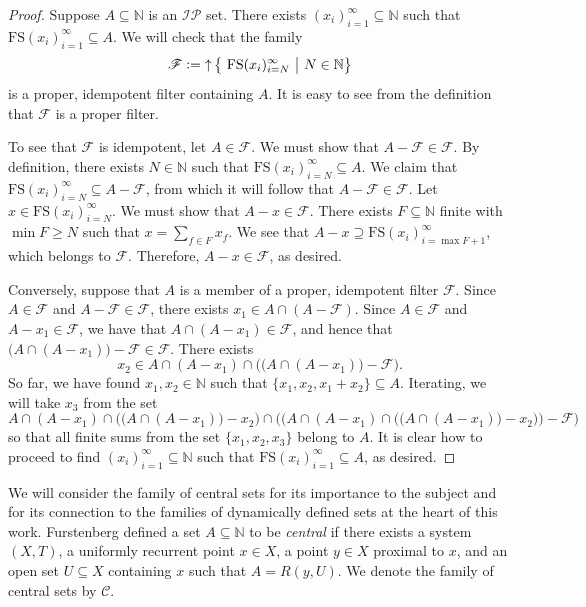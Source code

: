 \documentclass[letter,11pt]{article}
\theoremstyle{plain}
\theoremstyle{definition}
\theoremstyle{plain}
\theoremstyle{plain}
\numberwithin{equation}{section}
\newcommand{\N}{\mathbb{N}}
\newcommand{\defeq}{\vcentcolon=}
\renewcommand{\geq}{\geqslant}
\DeclareMathOperator{\upclose}{\uparrow}
\newcommand{\central}{\mathcal{C}}
\newcommand{\IP}{\mathcal{IP}}
\newcommand{\family}{\mathscr{F}}
\newcommand{\FS}{\text{FS}}
\begin{document}
\begin{proof}
    Suppose $A \subseteq \N$ is an $\IP$ set.  There exists $(x_i)_{i=1}^\infty \subseteq \N$ such that $\FS(x_i)_{i=1}^\infty \subseteq A$.  We will check that the family
    \[\family \defeq \upclose \big \{ \ \FS(x_i)_{i=N}^\infty \ \big | \ N \in \N \big\}\]
    is a proper, idempotent filter containing $A$. It is easy to see from the definition that $\family$ is a proper filter.
    
    To see that $\family$ is idempotent, let $A \in \family$.  We must show that $A - \family \in \family$.  By definition, there exists $N \in \N$ such that $\FS(x_i)_{i=N}^\infty \subseteq A$.  We claim that $\FS(x_i)_{i=N}^\infty \subseteq A - \family$, from which it will follow that $A - \family \in \family$.  Let $x \in \FS(x_i)_{i=N}^\infty$.  We must show that $A - x \in \family$.  There exists $F \subseteq \N$ finite with $\min F \geq N$ such that $x = \sum_{f \in F} x_f$.  We see that $A - x \supseteq \FS(x_i)_{i=\max F  + 1}^\infty$, which belongs to $\family$.  Therefore, $A - x \in \family$, as desired.

    Conversely, suppose that $A$ is a member of a proper, idempotent filter $\family$.  Since $A \in \family$ and $A - \family \in \family$, there exists $x_1 \in A \cap (A - \family)$.  Since $A \in \family$ and $A - x_1 \in \family$, we have that $A \cap (A-x_1) \in \family$, and hence that $\big(A \cap (A-x_1) \big) - \family \in \family$.  There exists
    \[x_2 \in A \cap (A-x_1) \cap \big( \big(A \cap (A-x_1) \big) - \family \big).\]
    So far, we have found $x_1, x_2 \in \N$ such that $\{x_1, x_2, x_1 + x_2\} \subseteq A$.  Iterating, we will take $x_3$ from the set
    \[A \cap (A-x_1) \cap \big( \big(A \cap (A-x_1) \big) - x_2 \big) \cap \bigg( \Big( A \cap (A-x_1) \cap \big( \big(A \cap (A-x_1) \big) - x_2 \big) \Big) - \family \bigg)\]
    so that all finite sums from the set $\{x_1, x_2, x_3\}$ belong to $A$. It is clear how to proceed to find $(x_i)_{i=1}^\infty \subseteq \N$ such that $\FS(x_i)_{i=1}^\infty \subseteq A$, as desired.
\end{proof}

We will consider the family of central sets for its importance to the subject and for its connection to the families of dynamically defined sets at the heart of this work.  Furstenberg \cite[Def. 8.3]{furstenberg_book_1981} defined a set $A \subseteq \N$ to be \emph{central} if there exists a system $(X,T)$, a uniformly recurrent point $x \in X$, a point $y \in X$ proximal to $x$, and an open set $U \subseteq X$ containing $x$ such that $A = R(y,U)$.  We denote the family of central sets by $\central$.
\end{document}
